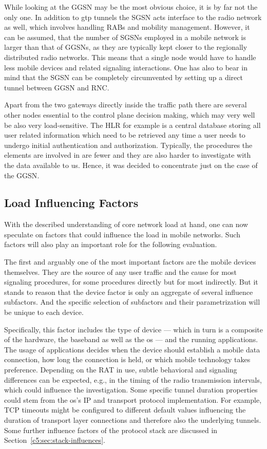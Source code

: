 While looking at the \gls{GGSN} may be the most obvious choice, it is by far not the only one. In addition to \gls{gtp} tunnels the \gls{SGSN} acts interface to the radio network as well, which involves handling \glspl{RAB} and mobility management. However, it can be assumed, that the number of \glspl{SGSN} employed in a mobile network is larger than that of \glspl{GGSN}, as they are typically kept closer to the regionally distributed radio networks. This means that a single node would have to handle less mobile devices and related signaling interactions. One has also to bear in mind that the \gls{SGSN} can be completely circumvented by setting up a direct tunnel between \gls{GGSN} and \gls{RNC}.

Apart from the two gateways directly inside the traffic path there are several other nodes essential to the control plane decision making, which may very well be also very load-sensitive. The \gls{HLR} for example is a central database storing all user related information which need to be retrieved any time a user needs to undergo initial authentication and authorization. Typically, the procedures the elements are involved in are fewer and they are also harder to investigate with the data available to us. Hence, it was decided to concentrate just on the case of the \gls{GGSN}.


\subsection{Load Influencing Factors}

With the described understanding of core network load at hand, one can now speculate on factors that could influence the load in mobile networks. Such factors will also play an important role for the following evaluation.

The first and arguably one of the most important factors are the mobile devices themselves. They are the source of any user traffic and the cause for most signaling procedures, for some procedures directly but for most indirectly. But it stands to reason that the device factor is only an aggregate of several influence subfactors. And the specific selection of subfactors and their parametrization will be unique to each device.

Specifically, this factor includes the type of device --- which in turn is a composite of the hardware, the baseband as well as the \gls{os} --- and the running applications. The usage of applications decides when the device should establish a mobile data connection, how long the connection is held, or which mobile technology takes preference. Depending on the \gls{RAT} in use, subtle behavioral and signaling differences can be expected, e.g., in the timing of the radio transmission intervals, which could influence the investigation. Some specific tunnel duration properties could stem from the \gls{os}'s \gls{IP} and transport protocol implementation. For example, \gls{TCP} timeouts might be configured to different default values influencing the duration of transport layer connections and therefore also the underlying tunnels. Some further influence factors of the protocol stack are discussed in Section~\ref{c5:sec:stack-influences}.

